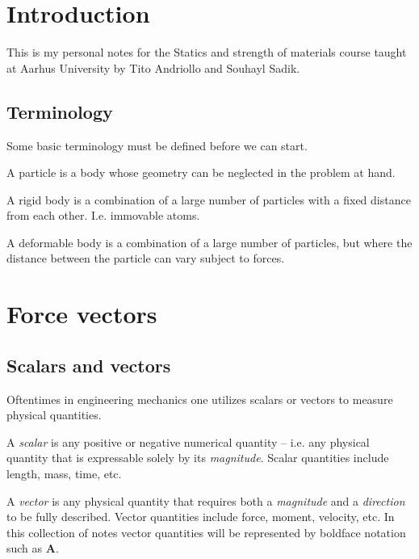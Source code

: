 
\section{Introduction}
This is my personal notes for the Statics and strength of materials course taught at Aarhus University by Tito Andriollo and Souhayl Sadik. 

\subsection{Terminology}
Some basic terminology must be defined before we can start.

\begin{definition}[Particle]
  A particle is a body whose geometry can be neglected in the problem at hand.
\end{definition}

\begin{definition}
  A rigid body is a combination of a large number of particles with a fixed distance from each other. I.e. immovable atoms.
\end{definition}

\begin{definition}
  A deformable body is a combination of a large number of particles, but where the distance between the particle can vary subject to forces.
\end{definition}

\section{Force vectors}

\subsection{Scalars and vectors}
Oftentimes in engineering mechanics one utilizes scalars or vectors to measure physical quantities.

\begin{definition}[Scalar]
  A \textit{scalar} is any positive or negative numerical quantity -- i.e. any physical quantity that is expressable solely by its \textit{magnitude}. Scalar quantities include length, mass, time, etc.
\end{definition}

\begin{definition}[Vector]
  A \textit{vector} is any physical quantity that requires both a \textit{magnitude} and a \textit{direction} to be fully described. Vector quantities include force, moment, velocity, etc. In this collection of notes vector quantities will be represented by boldface notation such as $\textbf{A}$.
\end{definition}

